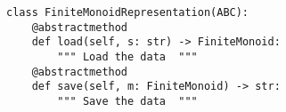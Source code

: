 \begin{verbatim}
class FiniteMonoidRepresentation(ABC):
    @abstractmethod
    def load(self, s: str) -> FiniteMonoid:
        """ Load the data  """
    @abstractmethod
    def save(self, m: FiniteMonoid) -> str:
        """ Save the data  """
\end{verbatim}